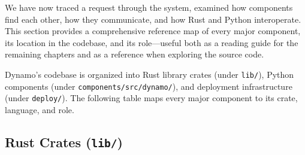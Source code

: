 We have now traced a request through the system, examined how components find each other, how they communicate, and how Rust and Python interoperate. This section provides a comprehensive reference map of every major component, its location in the codebase, and its role---useful both as a reading guide for the remaining chapters and as a reference when exploring the source code.

Dynamo's codebase is organized into Rust library crates (under \texttt{lib/}), Python components (under \texttt{components/src/dynamo/}), and deployment infrastructure (under \texttt{deploy/}). The following table maps every major component to its crate, language, and role.

\subsection{Rust Crates (\texttt{lib/})}

